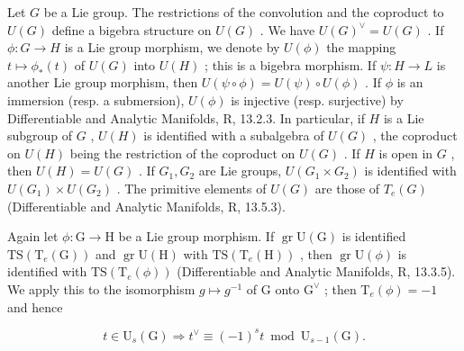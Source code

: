 Let \(G\) be a Lie group. The restrictions of the convolution and the coproduct to \(U(G)\) define a bigebra structure on \(U(G)\) . We have \(U(G)^{\vee} = U(G)\) . If \(\phi: G \to H\) is a Lie group morphism, we denote by \(U(\phi)\) the mapping \(t \mapsto \phi_{*}(t)\) of \(U(G)\) into \(U(H)\) ; this is a bigebra morphism. If \(\psi: H \to L\) is another Lie group morphism, then \(U(\psi \circ \phi) = U(\psi) \circ U(\phi)\) . If \(\phi\) is an immersion (resp. a submersion), \(U(\phi)\) is injective (resp. surjective) by Differentiable and Analytic Manifolds, R, 13.2.3. In particular, if \(H\) is a Lie subgroup of \(G\) , \(U(H)\) is identified with a subalgebra of \(U(G)\) , the coproduct on \(U(H)\) being the restriction of the coproduct on \(U(G)\) . If \(H\) is open in \(G\) , then \(U(H) = U(G)\) . If \(G_1, G_2\) are Lie groups, \(U(G_1 \times G_2)\) is identified with \(U(G_1) \times U(G_2)\) . The primitive elements of \(U(G)\) are those of \(T_e(G)\) (Differentiable and Analytic Manifolds, R, 13.5.3).

Again let \(\phi: \mathrm{G} \to \mathrm{H}\) be a Lie group morphism. If \(\operatorname{gr} \mathrm{U}(\mathrm{G})\) is identified \(\mathrm{TS}(\mathrm{T}_e(\mathrm{G}))\) and \(\operatorname{gr} \mathrm{U}(\mathrm{H})\) with \(\mathrm{TS}(\mathrm{T}_e(\mathrm{H}))\) , then \(\operatorname{gr} \mathrm{U}(\phi)\) is identified with \(\mathrm{TS}(\mathrm{T}_e(\phi))\) (Differentiable and Analytic Manifolds, R, 13.3.5). We apply this to the isomorphism \(g \mapsto g^{-1}\) of \(\mathrm{G}\) onto \(\mathrm{G}^{\vee}\) ; then \(\mathrm{T}_e(\phi) = -1\) and hence

\[
t \in \mathrm{U} _ {s} (\mathrm{G}) \Rightarrow t ^ {\vee} \equiv (- 1) ^ {s} t \bmod \mathrm{U} _ {s - 1} (\mathrm{G}).\tag{3}
\]

